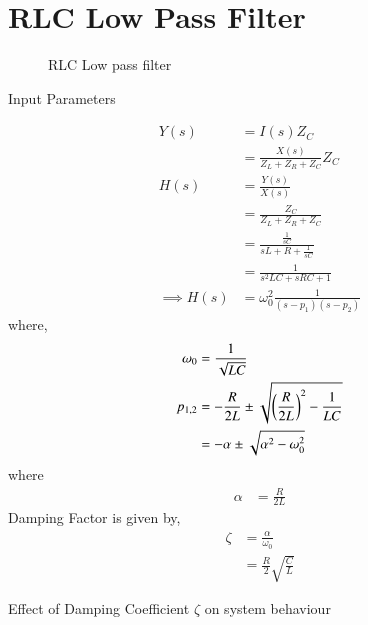 \documentclass[journal,12pt,twocolumn]{IEEEtran}
\theoremstyle{remark}
\begin{document}
\section{RLC Low Pass Filter}
\begin{figure}[!ht]
    \centering
    
    \caption{RLC Low pass filter}
\end{figure}
\begin{table}[!ht]
    \centering
    
    \caption{Input Parameters}
\end{table}
\begin{align}
    Y(s) &= I(s)Z_C\\
    &= \frac{X(s)}{Z_L + Z_R + Z_C}Z_C\\
    H(s) &= \frac{Y(s)}{X(s)}\\
    &= \frac{Z_C}{Z_L + Z_R + Z_C}\\
    &= \frac{\frac{1}{sC}}{sL + R + \frac{1}{sC}}\\
    &= \frac{1}{s^2LC + sRC + 1}\\
    \implies H(s) &= \omega_0^2\frac{1}{(s-p_1)(s-p_2)}
\end{align}
where,
\begin{align}
    \omega_0 &= \frac{1}{\sqrt{LC}}\\
    p_{1, 2} &= -\frac{R}{2L} \pm \sqrt{\left(\frac{R}{2L}\right)^2 - \frac{1}{LC}}\\
    &= -\alpha \pm \sqrt{\alpha^2 - \omega_0^2}
\end{align}
where
\begin{align}
    \alpha &= \frac{R}{2L}
\end{align}
Damping Factor is given by,
\begin{align}
   \zeta &= \frac{\alpha}{\omega_0}\\
   &= \frac{R}{2}\sqrt{\frac{C}{L}}
\end{align}
\begin{table}[!ht]
    \centering
    
    \caption{Effect of Damping Coefficient $\zeta$ on system behaviour}
\end{table}
\newpage
\end{document}
